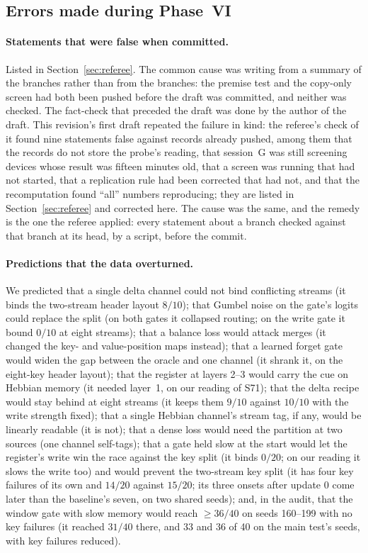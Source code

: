 \documentclass[11pt]{article}
\begin{document}
\subsection{Errors made during Phase~VI}
\label{sec:errors}

\paragraph{Statements that were false when committed.} Listed in Section~\ref{sec:referee}. The common cause was writing from a summary of the branches rather than from the branches: the premise test and the copy-only screen had both been pushed before the draft was committed, and neither was checked. The fact-check that preceded the draft was done by the author of the draft. This revision's first draft repeated the failure in kind: the referee's check of it found nine statements false against records already pushed, among them that the records do not store the probe's reading, that session~G was still screening devices whose result was fifteen minutes old, that a screen was running that had not started, that a replication rule had been corrected that had not, and that the recomputation found ``all'' numbers reproducing; they are listed in Section~\ref{sec:referee} and corrected here. The cause was the same, and the remedy is the one the referee applied: every statement about a branch checked against that branch at its head, by a script, before the commit.

\paragraph{Predictions that the data overturned.} We predicted that a single delta channel could not bind conflicting streams (it binds the two-stream header layout $8/10$); that Gumbel noise on the gate's logits could replace the split (on both gates it collapsed routing; on the write gate it bound $0/10$ at eight streams); that a balance loss would attack merges (it changed the key- and value-position maps instead); that a learned forget gate would widen the gap between the oracle and one channel (it shrank it, on the eight-key header layout); that the register at layers 2--3 would carry the cue on Hebbian memory (it needed layer~1, on our reading of S71); that the delta recipe would stay behind at eight streams (it keeps them $9/10$ against $10/10$ with the write strength fixed); that a single Hebbian channel's stream tag, if any, would be linearly readable (it is not); that a dense loss would need the partition at two sources (one channel self-tags); that a gate held slow at the start would let the register's write win the race against the key split (it binds $0/20$; on our reading it slows the write too) and would prevent the two-stream key split (it has four key failures of its own and $14/20$ against $15/20$; its three onsets after update 0 come later than the baseline's seven, on two shared seeds); and, in the audit, that the window gate with slow memory would reach $\geq 36/40$ on seeds 160--199 with no key failures (it reached $31/40$ there, and $33$ and $36$ of 40 on the main test's seeds, with key failures reduced).
\end{document}
